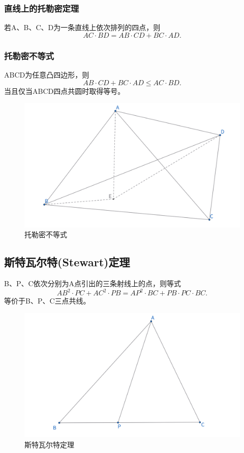 \newpage 
\subsubsection{直线上的托勒密定理}
\begin{theorem}[直线上的托勒密定理]
    若A、B、C、D为一条直线上依次排列的四点，则
    $$AC \cdot BD = AB \cdot CD + BC \cdot AD.$$
\end{theorem}
\subsubsection{托勒密不等式}
\begin{theorem}[托勒密不等式]
    ABCD为任意凸四边形，则
    $$AB \cdot CD + BC \cdot AD\leq AC \cdot BD.$$
    当且仅当ABCD四点共圆时取得等号。
\end{theorem}
\begin{figure}[htbp]
    \centering
    \includegraphics[width=0.7\linewidth]{figures/托勒密不等式.png}
    \caption{托勒密不等式}
\end{figure}

\newpage 
\subsection{斯特瓦尔特(Stewart)定理}
\begin{theorem}[斯特瓦尔特定理]
    B、P、C依次分别为A点引出的三条射线上的点，则等式
    $$
    AB^2\cdot PC+AC^2\cdot PB = AP^2\cdot BC + PB\cdot PC\cdot BC.
    $$
    等价于B、P、C三点共线。
\end{theorem}
\begin{figure}[ht]
    \centering
    \includegraphics[width=0.7\linewidth]{figures/斯特瓦尔特定理.png}
    \caption{斯特瓦尔特定理}
\end{figure}


